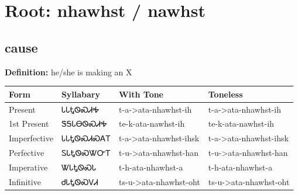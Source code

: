 \documentclass{article}%
\begin{document}
%
\normalsize%
\section*{Root: nhawhst / nawhst}%
\subsection*{cause}%
\textbf{Definition: }%
he/she is making an X%
\\[0.5em]%
\begin{tabular}{|l|l|l|l|}%
\hline%
\textbf{Form}&\textbf{Syllabary}&\textbf{With Tone}&\textbf{Toneless}\\%
\hline%
Present&ᏓᏓᎿᏫᏍᏗᎭ&t{-}a{-}>ata{-}nhawhst{-}ih&t{-}a{-}>ata{-}nhawhst{-}ih\\%
1st Present&ᏕᎦᏓᎾᏫᏍᏗᎭ&te{-}k{-}ata{-}nawhst{-}ih&te{-}k{-}ata{-}nawhst{-}ih\\%
Imperfective&ᏓᏓᎿᏫᏍᏗᏍᎪᎢ&t{-}a{-}>ata{-}nhawhst{-}ihsk&t{-}a{-}>ata{-}nhawhst{-}ihsk\\%
Perfective&ᏚᏓᎿᏫᏍᏔᏅᎢ&t{-}u{-}>ata{-}nhawhst{-}han&t{-}u{-}>ata{-}nhawhst{-}han\\%
Imperative&ᏔᏓᎿᏫᏍᏓ&t{-}h{-}ata{-}nhawhst{-}a&t{-}h{-}ata{-}nhawhst{-}a\\%
Infinitive&ᏧᏓᎿᏫᏍᏙᏗ&ts{-}u{-}>ata{-}nhawhst{-}oht&ts{-}u{-}>ata{-}nhawhst{-}oht\\%
\hline%
\end{tabular}%
\\[1em]%
\end{document}
